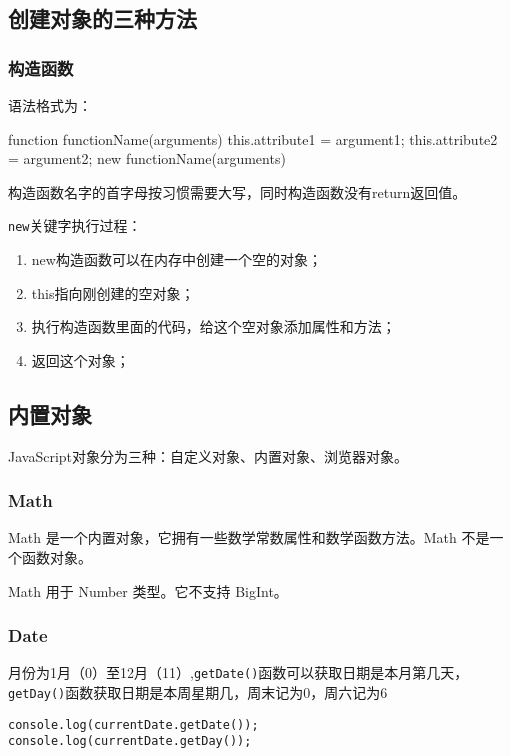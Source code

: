 \subsection{创建对象的三种方法}
\subsubsection{构造函数}
语法格式为：
\begin{js}
function functionName(arguments){
	this.attribute1 = argument1;
	this.attribute2 = argument2;
}
new functionName(arguments)
\end{js}

构造函数名字的首字母按习惯需要大写，同时构造函数没有return返回值。

\verb|new|关键字执行过程：
\begin{enumerate}
	\item new构造函数可以在内存中创建一个空的对象；
	\item this指向刚创建的空对象；
	\item 执行构造函数里面的代码，给这个空对象添加属性和方法；
	\item 返回这个对象；
\end{enumerate}

\subsection{内置对象}
JavaScript对象分为三种：自定义对象、内置对象、浏览器对象。

\subsubsection{Math}
Math 是一个内置对象，它拥有一些数学常数属性和数学函数方法。Math 不是一个函数对象。

Math 用于 Number 类型。它不支持 BigInt。
\subsubsection{Date}
月份为1月（0）至12月（11）,\verb|getDate()|函数可以获取日期是本月第几天，\verb|getDay()|函数获取日期是本周星期几，周末记为0，周六记为6

\begin{verbatim}
console.log(currentDate.getDate());
console.log(currentDate.getDay());	
\end{verbatim}
